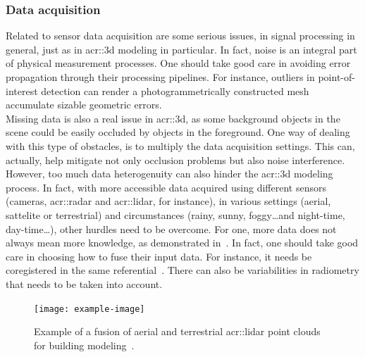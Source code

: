         \subsubsection{Data acquisition}
            Related to sensor data acquisition are some serious issues, in signal processing in general, just as in \gls{acr::3d} modeling in particular.
            In fact, noise is an integral part of physical measurement processes.
            One should take good care in avoiding error propagation through their processing pipelines.
            For instance, outliers in point-of-interest detection can render a photogrammetrically constructed mesh accumulate sizable geometric errors.\\
            Missing data is also a real issue in \gls{acr::3d}, as some background objects in the scene could be easily occluded by objects in the foreground.
            One way of dealing with this type of obstacles, is to multiply the data acquisition settings.
            This can, actually, help mitigate not only occlusion problems but also noise interference.\\
            However, too much data heterogenuity can also hinder the \gls{acr::3d} modeling process.
            In fact, with more accessible data acquired using different sensors (cameras, \gls{acr::radar} and \gls{acr::lidar}, for instance), in various settings (aerial, sattelite or terrestrial) and circumstances (rainy, sunny, foggy\dots and night-time, day-time\dots), other hurdles need to be overcome.
            For one, more data does not always mean more knowledge, as demonstrated in~\textcite{brachmann2018learning}.
            In fact, one should take good care in choosing how to fuse their input data.\addref
            For instance, it needs be coregistered in the same referential~\parencite{mezian2016uncertainty}.
            There can also be variabilities in radiometry that needs to be taken into account.\addref
            \begin{figure}[htpb]
                \centering
                \texttt{[image: example-image]}            
                \caption{
                    \label{fig::3d_aerial_terrestrial_fusion} Example of a fusion of aerial and terrestrial \gls{acr::lidar} point clouds for building modeling~\parencite{kedzierski2014terrestrial}.
                }
            \end{figure}

